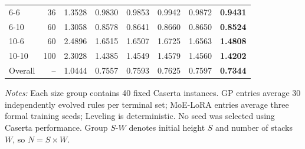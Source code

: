 \begin{table}[t]
{\begin{tabular}{lrrrrrrr}
    6-6 & 36 & 1.3528 & 0.9830 & 0.9853 & 0.9942 & 0.9872 & \textbf{0.9431} \\
    6-10 & 60 & 1.3058 & 0.8578 & 0.8641 & 0.8660 & 0.8650 & \textbf{0.8524} \\
    10-6 & 60 & 2.4896 & 1.6515 & 1.6507 & 1.6725 & 1.6563 & \textbf{1.4808} \\
    10-10 & 100 & 2.3028 & 1.4385 & 1.4549 & 1.4579 & 1.4560 & \textbf{1.4202} \\
    \midrule
    Overall & -- & 1.0444 & 0.7557 & 0.7593 & 0.7625 & 0.7597 & \textbf{0.7344} \\
    \bottomrule
  \end{tabular}%
  }
  \vspace{2pt}
  \parbox{0.98\textwidth}{\footnotesize \textit{Notes:} Each size group
  contains 40 fixed Caserta instances. GP entries average 30 independently
  evolved rules per terminal set; MoE-LoRA entries average three formal training
  seeds; Leveling is deterministic. No seed was selected using Caserta
  performance. Group $S$-$W$ denotes initial height $S$ and number of stacks
  $W$, so $N=S\times W$.}
\end{table}
